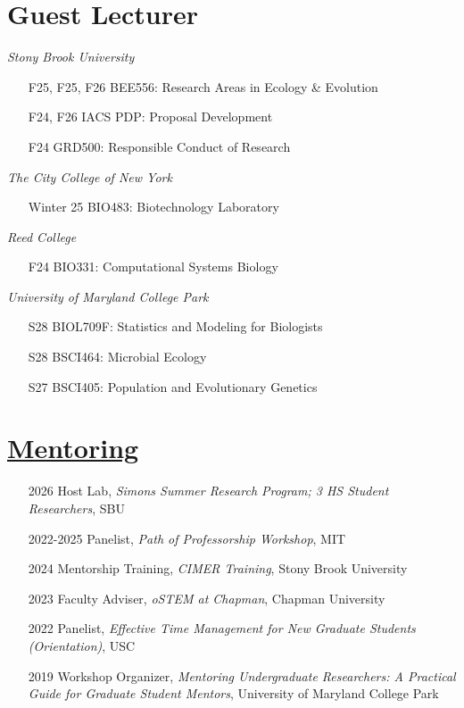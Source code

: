 \documentclass[]{res}
\begin{document}
\begin{resume}
\section{ Guest Lecturer} 
\emph{Stony Brook University}
\begin{itemize} \itemsep -2pt
\item[F25, F25, F26] BEE556: Research Areas in Ecology \& Evolution
\item[F24, F26] IACS PDP: Proposal Development
\item[F24] GRD500: Responsible Conduct of Research
\end{itemize}
\emph{The City College of New York}
\begin{itemize} \itemsep -2pt
\item[Winter 25] BIO483: Biotechnology Laboratory
\end{itemize}
\emph{Reed College}
\begin{itemize} \itemsep -2pt
\item[F24] BIO331: Computational Systems Biology
\end{itemize}
\emph{University of Maryland College Park}
\begin{itemize} \itemsep -2pt
\item[S28] BIOL709F: Statistics and Modeling for Biologists
\item[S28] BSCI464: Microbial Ecology
\item[S27] BSCI405: Population and Evolutionary Genetics
\end{itemize}



\section{\underline{Mentoring}} 
\begin{itemize}
\item[2026] { Host Lab,} \emph{Simons Summer Research Program; 3 HS Student Researchers}, SBU
\item[2022-2025] { Panelist,} \emph{Path of Professorship Workshop}, MIT
\item[2024] {Mentorship Training}, \emph{CIMER Training}, Stony Brook University
\item[2023] {Faculty Adviser,} \emph{oSTEM at Chapman}, Chapman University
\item[2022] {Panelist,} \emph{Effective Time Management for New Graduate Students (Orientation)}, USC
\item[2019] {Workshop Organizer,} \emph{Mentoring Undergraduate Researchers: A Practical Guide for Graduate Student Mentors}, University of Maryland College Park
\end{itemize}

\end{resume}
\end{document}
